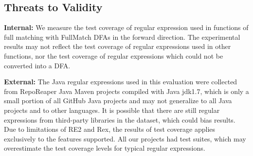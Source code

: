 \subsection{Threats to Validity}
\textbf{Internal: } We measure the test coverage of regular expression used in functions of full matching with FullMatch DFAs in the forward direction. The experimental results may not reflect the test coverage of regular expressions used in other functions, nor the test coverage of regular expressions which could not be converted into a DFA.

\noindent \textbf{External: } The Java regular expressions used in this evaluation were collected from RepoReaper Java Maven projects compiled with Java jdk1.7, which is only a small portion of all GitHub Java projects and may not generalize to all Java projects and to other languages. 
It is possible that there are still regular expressions from third-party libraries in the dataset, which could bias results.
Due to limitations of RE2 and Rex, the results of test coverage applies exclusively to the features supported. %
All our projects had test suites, which may overestimate the test coverage levels for typical regular expressions. 


	
